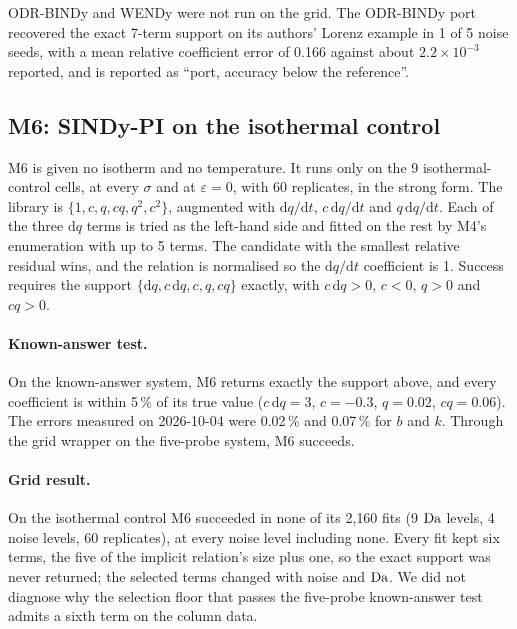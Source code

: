 ODR-BINDy and WENDy were not run on the grid. The ODR-BINDy port recovered the exact
7-term support on its authors' Lorenz example in 1 of 5 noise seeds, with a mean relative
coefficient error of 0.166 against about $2.2\times10^{-3}$ reported, and is reported as
``port, accuracy below the reference''.

\subsection*{M6: SINDy-PI on the isothermal control}
M6 is given no isotherm and no temperature. It runs only on the 9 isothermal-control cells,
at every $\sigma$ and at $\varepsilon = 0$, with 60 replicates, in the strong form. The
library is $\{1, c, q, cq, q^2, c^2\}$, augmented with $\mathrm{d}q/\mathrm{d}t$,
$c\,\mathrm{d}q/\mathrm{d}t$ and $q\,\mathrm{d}q/\mathrm{d}t$. Each of the three
$\mathrm{d}q$ terms is tried as the left-hand side and fitted on the rest by M4's
enumeration with up to 5 terms. The candidate with the smallest relative residual wins, and
the relation is normalised so the $\mathrm{d}q/\mathrm{d}t$ coefficient is 1. Success
requires the support $\{\mathrm{d}q, c\,\mathrm{d}q, c, q, cq\}$ exactly, with
$c\,\mathrm{d}q > 0$, $c < 0$, $q > 0$ and $cq > 0$.

\paragraph{Known-answer test.} On the known-answer system, M6 returns exactly the support
above, and every coefficient is within 5\,\% of its true value ($c\,\mathrm{d}q = 3$,
$c = -0.3$, $q = 0.02$, $cq = 0.06$). The errors measured on 2026-10-04 were 0.02\,\% and
0.07\,\% for $b$ and $k$. Through the grid wrapper on the five-probe system, M6 succeeds.

\paragraph{Grid result.} On the isothermal control M6 succeeded in none of its 2{,}160 fits
(9 $\mathrm{Da}$ levels, 4 noise levels, 60 replicates), at every noise level including none. Every fit
kept six terms, the five of the implicit relation's size plus one, so the exact support was never
returned; the selected terms changed with noise and $\mathrm{Da}$. We did not diagnose why the selection
floor that passes the five-probe known-answer test admits a sixth term on the column data.

